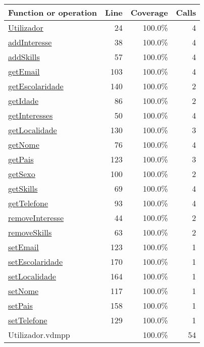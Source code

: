 \bigskip
\begin{longtable}{|l|r|r|r|}
\hline
Function or operation & Line & Coverage & Calls \\
\hline
\hline
\hyperref[Utilizador:24]{Utilizador} & 24&100.0\% & 4 \\
\hline
\hyperref[addInteresse:38]{addInteresse} & 38&100.0\% & 4 \\
\hline
\hyperref[addSkills:57]{addSkills} & 57&100.0\% & 4 \\
\hline
\hyperref[getEmail:103]{getEmail} & 103&100.0\% & 4 \\
\hline
\hyperref[getEscolaridade:140]{getEscolaridade} & 140&100.0\% & 2 \\
\hline
\hyperref[getIdade:86]{getIdade} & 86&100.0\% & 2 \\
\hline
\hyperref[getInteresses:50]{getInteresses} & 50&100.0\% & 4 \\
\hline
\hyperref[getLocalidade:130]{getLocalidade} & 130&100.0\% & 3 \\
\hline
\hyperref[getNome:76]{getNome} & 76&100.0\% & 4 \\
\hline
\hyperref[getPais:123]{getPais} & 123&100.0\% & 3 \\
\hline
\hyperref[getSexo:100]{getSexo} & 100&100.0\% & 2 \\
\hline
\hyperref[getSkills:69]{getSkills} & 69&100.0\% & 4 \\
\hline
\hyperref[getTelefone:93]{getTelefone} & 93&100.0\% & 4 \\
\hline
\hyperref[removeInteresse:44]{removeInteresse} & 44&100.0\% & 2 \\
\hline
\hyperref[removeSkills:63]{removeSkills} & 63&100.0\% & 2 \\
\hline
\hyperref[setEmail:123]{setEmail} & 123&100.0\% & 1 \\
\hline
\hyperref[setEscolaridade:170]{setEscolaridade} & 170&100.0\% & 1 \\
\hline
\hyperref[setLocalidade:164]{setLocalidade} & 164&100.0\% & 1 \\
\hline
\hyperref[setNome:117]{setNome} & 117&100.0\% & 1 \\
\hline
\hyperref[setPais:158]{setPais} & 158&100.0\% & 1 \\
\hline
\hyperref[setTelefone:129]{setTelefone} & 129&100.0\% & 1 \\
\hline
\hline
Utilizador.vdmpp & & 100.0\% & 54 \\
\hline
\end{longtable}

